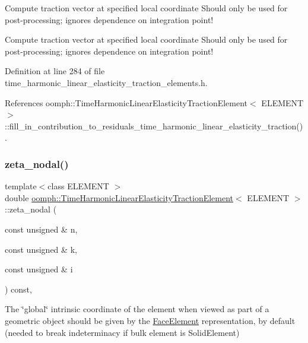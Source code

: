 Compute traction vector at specified local coordinate Should only be used for post-\/processing; ignores dependence on integration point! 

Compute traction vector at specified local coordinate Should only be used for post-\/processing; ignores dependence on integration point! 

Definition at line 284 of file time\+\_\+harmonic\+\_\+linear\+\_\+elasticity\+\_\+traction\+\_\+elements.\+h.



References oomph\+::\+Time\+Harmonic\+Linear\+Elasticity\+Traction\+Element$<$ E\+L\+E\+M\+E\+N\+T $>$\+::fill\+\_\+in\+\_\+contribution\+\_\+to\+\_\+residuals\+\_\+time\+\_\+harmonic\+\_\+linear\+\_\+elasticity\+\_\+traction().

\mbox{\label{classoomph_1_1TimeHarmonicLinearElasticityTractionElement_a6477822c4cd242cccaacaea672155b8f}} 
\subsubsection{\texorpdfstring{zeta\+\_\+nodal()}{zeta\_nodal()}}
{\footnotesize\ttfamily template$<$class E\+L\+E\+M\+E\+NT $>$ \\
double \hyperlink{classoomph_1_1TimeHarmonicLinearElasticityTractionElement}{oomph\+::\+Time\+Harmonic\+Linear\+Elasticity\+Traction\+Element}$<$ E\+L\+E\+M\+E\+NT $>$\+::zeta\+\_\+nodal (\begin{DoxyParamCaption}\item[{const unsigned \&}]{n,  }\item[{const unsigned \&}]{k,  }\item[{const unsigned \&}]{i }\end{DoxyParamCaption}) const\hspace{0.3cm}{\ttfamily [inline]}, {\ttfamily [virtual]}}



The \char`\"{}global\char`\"{} intrinsic coordinate of the element when viewed as part of a geometric object should be given by the \hyperlink{classoomph_1_1FaceElement}{Face\+Element} representation, by default (needed to break indeterminacy if bulk element is Solid\+Element) 

